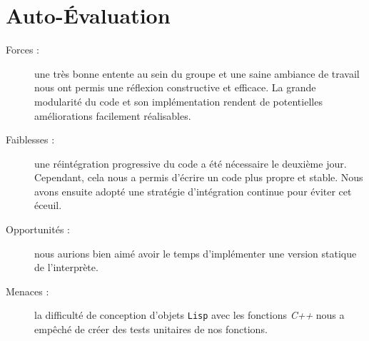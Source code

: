 \section*{Auto-Évaluation}

\begin{description}
\item[Forces :] une très bonne entente au sein du groupe et une
  saine ambiance de travail nous ont permis une réflexion constructive
  et efficace. 
  La grande modularité du code et son implémentation rendent de
  potentielles améliorations facilement réalisables. 
\item[Faiblesses :] une réintégration progressive du code a été
  nécessaire le deuxième jour. Cependant, cela nous a permis d'écrire
  un code plus propre et stable. Nous avons ensuite adopté une
  stratégie d'intégration continue pour éviter cet éceuil. 
\item[Opportunités :] nous aurions bien aimé avoir le temps
  d'implémenter une version statique de l'interprète.  
\item[Menaces :] la difficulté de conception d'objets \texttt{Lisp}
  avec les fonctions \emph{C++} nous a empêché de créer des tests unitaires de
  nos fonctions. 
\end{description}

\appendix
